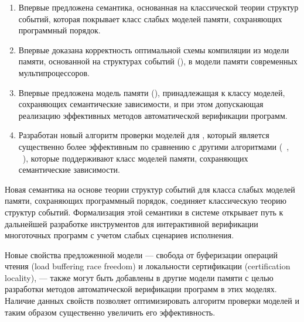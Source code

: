 {\novelty}
\begin{enumerate}[beginpenalty=10000] %

  \item Впервые предложена семантика, основанная на классической теории структур событий,
    которая покрывает класс слабых моделей памяти, сохраняющих программный порядок.

  \item Впервые доказана корректность оптимальной схемы компиляции
    из модели памяти, основанной на структурах событий (\Wkm), 
    в модели памяти современных мультипроцессоров.

  \item Впервые предложена модель памяти (\WkmS),
    принадлежащая к классу моделей, сохраняющих семантические зависимости, 
    и при этом допускающая реализацию эффективных методов автоматической верификации программ. 

  \item Разработан новый алгоритм проверки моделей для \WkmS,
    который является существенно более эффективным по сравнению с другими алгоритмами
    (\CDSChecker~\autocite{Norris-Demsky:OOPSLA2013}, \rmem~\autocite{Pulte-al:PLDI2019}),
    которые поддерживают класс моделей памяти, сохраняющих семантические зависимости.

\end{enumerate}

{\influence} 

Новая семантика на основе теории структур событий 
для класса слабых моделей памяти, сохраняющих программный порядок,
соединяет классическую теорию структур событий.
Формализация этой семантики в системе \coq открывает 
путь к дальнейшей разработке инструментов для  
интерактивной верификации многоточных программ  
с учетом слабых сценариев исполнения. 
 
Новые свойства предложенной модели \WkmS ---
свобода от буферизации операций чтения (load buffering race freedom)
и локальности сертификации (certification locality), --- 
также могут быть добавлены в другие модели памяти 
с целью разработки методов автоматической верификации программ в этих моделях. 
Наличие данных свойств позволяет оптимизировать алгоритм 
проверки моделей и таким образом существенно увеличить его эффективность.

